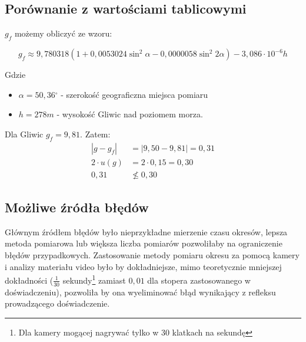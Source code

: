 \documentclass[a4paper,12pt]{article}
\newcommand{\stopnie}{\ensuremath{^{\circ}}}
\begin{document}
\subsection*{Porównanie z wartościami tablicowymi}

$g_f$ możemy obliczyć ze wzoru\cite{wzor}:

\[g_f \approx 9,780318 \left(1 + 0,0053024 \sin^2 \alpha - 0,0000058 \sin^2 2\alpha\right) - 3,086 \cdot 10^{ -6} h\]

Gdzie
\begin{itemize}
	\item $\alpha = 50,36\stopnie$ - szerokość geograficzna miejsca pomiaru
	\item $h = 278m$ - wysokość Gliwic nad poziomem morza.
\end{itemize}

Dla Gliwic $g_f = 9,81$. Zatem:
\begin{align*}
	\left| g - g_f \right|  & = \left| 9,50 - 9,81 \right| = 0,31 \\
	2 \cdot u\left(g\right) & = 2 \cdot 0,15 = 0,30               \\
	0,31\,                   & \not\leq 0,30
\end{align*}

\subsection*{Możliwe źródła błędów}

Głównym źródłem błędów było nieprzykładne mierzenie czasu okresów, lepsza metoda pomiarowa lub większa liczba pomiarów pozwoliłaby na ograniczenie błędów przypadkowych. Zastosowanie metody pomiaru okresu za pomocą kamery i analizy materiału video było by dokładniejsze, mimo teoretycznie mniejszej dokładności ($\frac{1}{30}$ sekundy\footnote{Dla kamery mogącej nagrywać tylko w 30 klatkach na sekundę} zamiast $0,01$ dla stopera zastosowanego w doświadczeniu), pozwoliła by ona wyeliminować błąd wynikający z refleksu prowadzącego doświadczenie.



\end{document}
